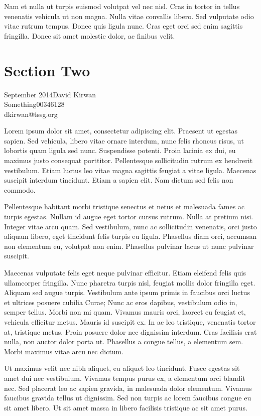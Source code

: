 \documentclass[runningheads,a4paper]{llncs}
\begin{document}
Nam et nulla ut turpis euismod volutpat vel nec nisl. Cras in tortor in tellus venenatis vehicula ut non magna. Nulla vitae convallis libero. Sed vulputate odio vitae rutrum tempus. Donec quis ligula nunc. Cras eget orci sed enim sagittis fringilla. Donec sit amet molestie dolor, ac finibus velit.
%
\newpage
%
\section{Section Two}
\vspace{1cm}
\begin{flushright}\noindent
September 2014\hfill David Kirwan\\
Something\hfill 00346128\\
dkirwan@tssg.org
\end{flushright}
%
Lorem ipsum dolor sit amet, consectetur adipiscing elit. Praesent ut egestas sapien. Sed vehicula, libero vitae ornare interdum, nunc felis rhoncus risus, ut lobortis quam ligula sed nunc. Suspendisse potenti. Proin lacinia ex dui, eu maximus justo consequat porttitor. Pellentesque sollicitudin rutrum ex hendrerit vestibulum. Etiam luctus leo vitae magna sagittis feugiat a vitae ligula. Maecenas suscipit interdum tincidunt. Etiam a sapien elit. Nam dictum sed felis non commodo.

Pellentesque habitant morbi tristique senectus et netus et malesuada fames ac turpis egestas. Nullam id augue eget tortor cursus rutrum. Nulla at pretium nisi. Integer vitae arcu quam. Sed vestibulum, nunc ac sollicitudin venenatis, orci justo aliquam libero, eget tincidunt felis turpis eu ligula. Phasellus diam orci, accumsan non elementum eu, volutpat non enim. Phasellus pulvinar lacus ut nunc pulvinar suscipit.

Maecenas vulputate felis eget neque pulvinar efficitur. Etiam eleifend felis quis ullamcorper fringilla. Nunc pharetra turpis nisl, feugiat mollis dolor fringilla eget. Aliquam sed augue turpis. Vestibulum ante ipsum primis in faucibus orci luctus et ultrices posuere cubilia Curae; Nunc ac eros dapibus, vestibulum odio in, semper tellus. Morbi non mi quam. Vivamus mauris orci, laoreet eu feugiat et, vehicula efficitur metus. Mauris id suscipit ex. In ac leo tristique, venenatis tortor at, tristique metus. Proin posuere dolor nec dignissim interdum. Cras facilisis erat nulla, non auctor dolor porta ut. Phasellus a congue tellus, a elementum sem. Morbi maximus vitae arcu nec dictum.

Ut maximus velit nec nibh aliquet, eu aliquet leo tincidunt. Fusce egestas sit amet dui nec vestibulum. Vivamus tempus purus ex, a elementum orci blandit nec. Sed placerat leo ac sapien gravida, in malesuada dolor elementum. Vivamus faucibus gravida tellus ut dignissim. Sed non turpis ac lorem faucibus congue eu sit amet libero. Ut sit amet massa in libero facilisis tristique ac sit amet purus.
\end{document}
